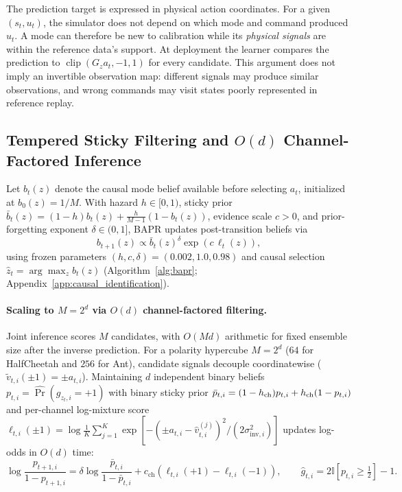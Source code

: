\documentclass[twoside,11pt]{article}
\newcommand{\gain}{G}
\newcommand{\clip}{\operatorname{clip}}
\begin{document}
The prediction target is expressed in physical action coordinates. For a given $(s_t,u_t)$, the simulator does not depend on which mode and command produced $u_t$. A mode can therefore be new to calibration while its \emph{physical signals} are within the reference data's support. At deployment the learner compares the prediction to $\clip(\gain_z a_t,-1,1)$ for every candidate. This argument does not imply an invertible observation map: different signals may produce similar observations, and wrong commands may visit states poorly represented in reference replay.

\subsection{Tempered Sticky Filtering and \texorpdfstring{$O(d)$}{O(d)} Channel-Factored Inference}

Let $b_t(z)$ denote the causal mode belief available before selecting $a_t$, initialized at $b_0(z)=1/M$. With hazard $h\in[0,1)$, sticky prior $\bar b_t(z)=(1-h)b_t(z)+\frac{h}{M-1}(1-b_t(z))$, evidence scale $c>0$, and prior-forgetting exponent $\delta\in(0,1]$, BAPR updates post-transition beliefs via
\begin{equation}
    b_{t+1}(z)\propto \bar b_t(z)^{\delta}
    \exp\!\left(c\,\ell_t(z)\right),
    \label{eq:posterior}
\end{equation}
using frozen parameters $(h,c,\delta)=(0.002,1.0,0.98)$ and causal selection $\hat z_t=\arg\max_z b_t(z)$ (Algorithm~\ref{alg:bapr}; Appendix~\ref{app:causal_identification}).

\paragraph{Scaling to $M=2^d$ via $O(d)$ channel-factored filtering.}
Joint inference scores $M$ candidates, with $O(Md)$ arithmetic for fixed ensemble size after the inverse prediction. For a polarity hypercube $M=2^d$ ($64$ for HalfCheetah and $256$ for Ant), candidate signals decouple coordinatewise ($\tilde v_{t,i}(\pm 1)=\pm a_{t,i}$). Maintaining $d$ independent binary beliefs $p_{t,i}=\hat{\Pr}(g_{z_t,i}=+1)$ with binary sticky prior $\bar p_{t,i}=(1-h_{\rm ch})p_{t,i}+h_{\rm ch}(1-p_{t,i})$ and per-channel log-mixture score $\ell_{t,i}(\pm 1)=\log\frac{1}{K}\sum_{j=1}^K\exp[-(\pm a_{t,i}-\hat v_{t,i}^{(j)})^2/(2\sigma_{\mathrm{inv},i}^2)]$ updates log-odds in $O(d)$ time:
\begin{equation}
    \log\frac{p_{t+1,i}}{1-p_{t+1,i}}
    = \delta\log\frac{\bar p_{t,i}}{1-\bar p_{t,i}}
      + c_{\mathrm{ch}}\left(\ell_{t,i}(+1)-\ell_{t,i}(-1)\right),
    \qquad
    \hat g_{t,i}=2\mathbb{I}[p_{t,i}\ge\tfrac{1}{2}]-1.
    \label{eq:factored_filter}
\end{equation}
\end{document}
